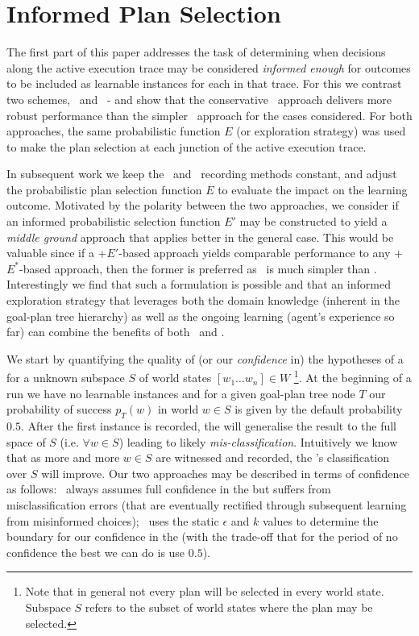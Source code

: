 \section{Informed Plan Selection}\label{sec:coverage}



The first part of this paper addresses the task of determining when decisions
along the active execution trace may be considered \textit{informed enough} for
outcomes to be included as learnable instances for each \dt in that trace. For
this we contrast two schemes, \CL\ and \BUL\ - and show that the conservative
\BUL\ approach delivers more robust performance than the simpler \CL\ approach
for the cases considered. For both approaches, the same probabilistic function
$E$ (or exploration strategy) was used to make the plan selection at each
junction of the active execution trace.

In subsequent work we keep the \CL\ and \BUL\ recording methods constant, and
adjust the probabilistic plan selection function $E$ to evaluate the impact on
the learning outcome. Motivated by the polarity between the two approaches, we
consider if an informed probabilistic selection function $E'$ may be constructed
to yield a \textit{middle ground} approach that applies better in the general
case. This would be valuable since if a \CL+$E'$-based approach yields comparable
performance to any \BUL+$E^*$-based approach, then the former is preferred as
\CL\ is much simpler than \BUL. Interestingly we find that such a formulation is
possible and that an informed exploration strategy that leverages both the domain
knowledge (inherent in the goal-plan tree hierarchy) as well as the ongoing
learning (agent's experience so far) can combine the benefits of both \CL\ and
\BUL.

We start by quantifying the quality of (or our \textit{confidence} in) the
hypotheses of a \dt for a unknown subspace $S$ of world states $[w_1 \ldots w_n]
\in W$ \footnote{Note that in general not every plan will be selected in every
world state. Subspace $S$ refers to the subset of world states where the plan may
be selected.}. At the beginning of a run we have no learnable instances and for a
given goal-plan tree node $T$ our probability of success $p_T(w)$ in world $w \in
S$ is given by the default probability $0.5$. After the first instance is
recorded, the \dt will generalise the result to the full space of $S$ (i.e.
$\forall w \in S$) leading to likely \textit{mis-classification}. Intuitively we
know that as more and more $w \in S$ are witnessed and recorded, the \dt's
classification over $S$ will improve. Our two approaches may be described in
terms of confidence as follows: \CL\ always assumes full confidence in the \dt
but suffers from misclassification errors (that are eventually rectified through
subsequent learning from misinformed choices); \BUL\ uses the static $\epsilon$
and $k$ values to determine the boundary for our confidence in the \dt (with the
trade-off that for the period of no confidence the best we can do is use $0.5$).

